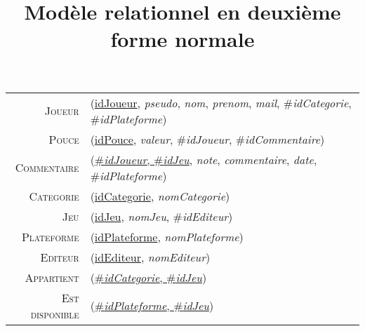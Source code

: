 \documentclass{article}
\title{Modèle relationnel en deuxième forme normale}
\newenvironment{mld}
{\par\begin{minipage}{\linewidth}\begin{tabular}{rp{\linewidth}}}
{\end{tabular}\end{minipage}\par}
\newcommand{\relat}[1]{\textsc{#1}}
\newcommand{\attr}[1]{\emph{#1}}
\newcommand{\prim}[1]{\uline{#1}}
\newcommand{\foreign}[1]{\#\textsl{#1}}
\begin{document}
\maketitle{}

\begin{mld}
  \relat{Joueur} & (\prim{idJoueur}, \attr{pseudo}, \attr{nom}, \attr{prenom}, \attr{mail}, \foreign{idCategorie}, \foreign{idPlateforme})\\
  \relat{Pouce} & (\prim{idPouce}, \attr{valeur}, \foreign{idJoueur}, \foreign{idCommentaire})\\
  \relat{Commentaire} & (\prim{\foreign{idJoueur}, \foreign{idJeu}}, \attr{note}, \attr{commentaire}, \attr{date}, \foreign{idPlateforme})\\
  \relat{Categorie} & (\prim{idCategorie}, \attr{nomCategorie})\\
  \relat{Jeu} & (\prim{idJeu}, \attr{nomJeu}, \foreign{idEditeur})\\
  \relat{Plateforme} & (\prim{idPlateforme}, \attr{nomPlateforme})\\
  \relat{Editeur} & (\prim{idEditeur}, \attr{nomEditeur})\\
  \relat{Appartient} & (\prim{\foreign{idCategorie}, \foreign{idJeu}})\\
  \relat{Est disponible} & (\prim{\foreign{idPlateforme}, \foreign{idJeu}})\\
\end{mld}
\end{document}
